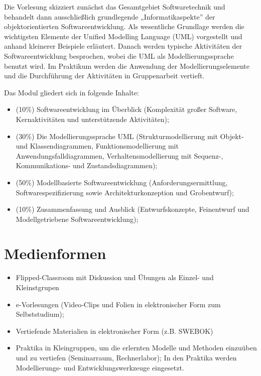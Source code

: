 Die Vorlesung skizziert zunächst das Gesamtgebiet Softwaretechnik und
behandelt dann ausschließlich grundlegende „Informatikaspekte'' der
objektorientierten Softwareentwicklung. Als wesentliche Grundlage werden
die wichtigsten Elemente der Unified Modelling Language (UML)
vorgestellt und anhand kleinerer Beispiele erläutert. Danach werden
typische Aktivitäten der Softwareentwicklung besprochen, wobei die UML
als Modellierungssprache benutzt wird. Im Praktikum werden die Anwendung
der Modellierungselemente und die Durchführung der Aktivitäten in
Gruppenarbeit vertieft.

Das Modul gliedert sich in folgende Inhalte:

\begin{itemize}
\tightlist
\item
  (10\%) Softwareentwicklung im Überblick (Komplexität großer Software,
  Kernaktivitäten und unterstützende Aktivitäten);
\item
  (30\%) Die Modellierungssprache UML (Strukturmodellierung mit Objekt-
  und Klassendiagrammen, Funktionsmodellierung mit
  Anwendungsfalldiagrammen, Verhaltensmodellierung mit Sequenz-,
  Kommunikations- und Zustandsdiagrammen);
\item
  (50\%) Modellbasierte Softwareentwicklung (Anforderungsermittlung,
  Softwarespezifizierung sowie Architekturkonzeption und Grobentwurf);
\item
  (10\%) Zusammenfassung und Ausblick (Entwurfskonzepte, Feinentwurf und
  Modellgetriebene Softwareentwicklung);
\end{itemize}

\hypertarget{medienformenpathlabel....srcmodulbeschreibungen-bachelor-bpo5ba_softwaretechnik}{%
\section*{Medienformen\label{../../src/modulbeschreibungen-bachelor-bpo5/BA_Softwaretechnik}}\label{medienformenpathlabel....srcmodulbeschreibungen-bachelor-bpo5ba_softwaretechnik}}

\begin{itemize}
\tightlist
\item
  Flipped-Classroom mit Diskussion und Übungen als Einzel- und
  Kleinstgrupen
\item
  e-Vorlesungen (Video-Clips und Folien in elektronischer Form zum
  Selbststudium);
\item
  Vertiefende Materialien in elektronischer Form (z.B. SWEBOK)
\item
  Praktika in Kleingruppen, um die erlernten Modelle und Methoden
  einzuüben und zu vertiefen (Seminarraum, Rechnerlabor); In den
  Praktika werden Modellierungs- und Entwicklungswerkzeuge eingesetzt.
\end{itemize}

